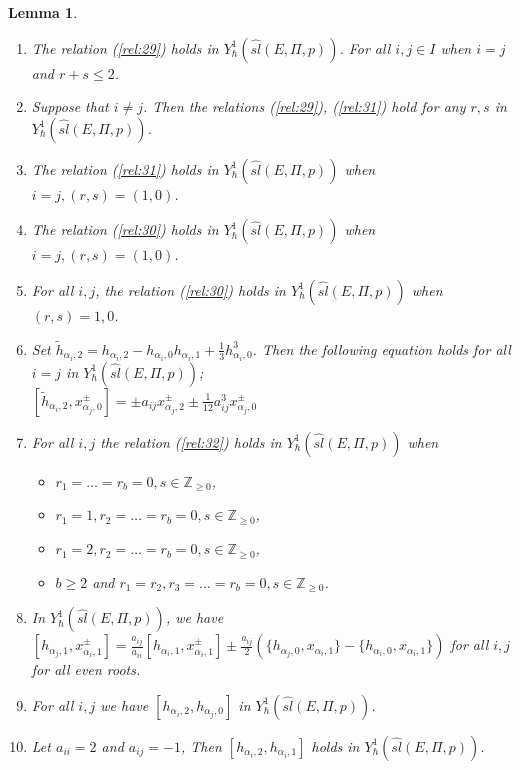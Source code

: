 \documentclass[english]{elsarticle}
\newtheorem{lemma}{Lemma}[section]
\numberwithin{equation}{section}
\begin{document}
\begin{lemma}
\label{lem:2}
\begin{enumerate}
    \item The relation (\ref{rel:29}) holds in $Y_{\hbar}^1(\hat{sl}(E,\Pi,p))$. For all $i,j\in I$ when $i=j$ and $r+s \leq 2$.
    \item Suppose that $i\neq j$. Then the relations (\ref{rel:29}), (\ref{rel:31}) hold for any $r,s$ in $Y_{\hbar}^1(\hat{sl}(E,\Pi,p))$.
    \item The relation (\ref{rel:31}) holds in $Y_{\hbar}^1(\hat{sl}(E,\Pi,p))$ when $i=j,(r,s)=(1,0)$.
    \item The relation (\ref{rel:30}) holds in $Y_{\hbar}^1(\hat{sl}(E,\Pi,p))$ when $i=j,(r,s)=(1,0)$.
    \item For all $i,j$, the relation (\ref{rel:30}) holds in $Y_{\hbar}^1(\hat{sl}(E,\Pi,p))$ when $(r,s)=1,0$.
    \item Set $\tilde{h}_{\alpha_i,2}=h_{\alpha_i,2}-h_{\alpha_i,0}h_{\alpha_i,1}+\frac{1}{3}h_{\alpha_i,0}^3$. Then the following equation holds for all $i=j$ in $Y_{\hbar}^1(\hat{sl}(E,\Pi,p))$;\\
    $[\tilde{h}_{\alpha_i,2},x_{\alpha_j,0}^{\pm}]=\pm a_{ij}x_{\alpha_j,2}^{\pm} \pm \frac{1}{12}  a_{ij}^3x_{\alpha_j,0}^{\pm}$
    \item For all $i,j$ the relation (\ref{rel:32}) holds in $Y_{\hbar}^1(\hat{sl}(E,\Pi,p))$ when
    \begin{itemize}
        \item $r_1=\ldots=r_b=0, s\in \mathbb{Z}_{\geq 0}$,
        \item $r_1=1,r_2=\ldots=r_b=0, s\in \mathbb{Z}_{\geq 0}$,
        \item $r_1=2,r_2=\ldots=r_b=0, s\in \mathbb{Z}_{\geq 0}$,
        \item $b \geq 2 $ and $r_1=r_2,r_3=\ldots=r_b=0, s\in \mathbb{Z}_{\geq 0}$.
    \end{itemize}
    \item In $Y_{\hbar}^1(\hat{sl}(E,\Pi,p))$, we have $[h_{\alpha_j,1},x_{\alpha_i,1}^{\pm}]=\frac{a_{ij}}{a_{ii}}[h_{\alpha_i,1},x_{\alpha_i,1}^{\pm}]\pm \frac{a_{ij}}{2}(\{h_{\alpha_j,0},x_{\alpha_i,1}\}-\{h_{\alpha_i,0},x_{\alpha_i,1} \})$ for all $i,j$ for all even roots.
    \item For all $i,j$ we have $[h_{\alpha_i,2},h_{\alpha_j,0}]$ in $Y_{\hbar}^1(\hat{sl}(E,\Pi,p))$.
    \item Let $a_{ii}=2$ and $a_{ij}=-1$, Then $[h_{\alpha_i,2},h_{\alpha_i,1}]$ holds in $Y_{\hbar}^1(\hat{sl}(E,\Pi,p))$.
\end{enumerate}
\end{lemma}
\end{document}
